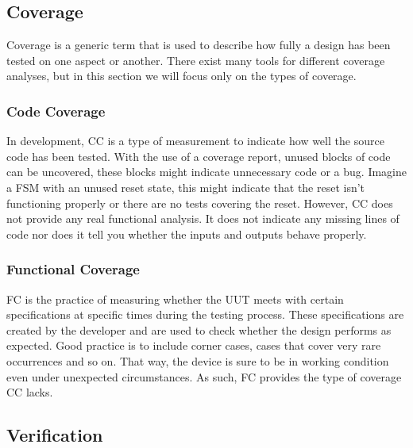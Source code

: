 \documentclass[11pt,british]{article}
\begin{document}
\subsection{Coverage}
Coverage is a generic term that is used to describe how fully a design has been tested on one aspect or another. There exist many tools for different coverage analyses, but in this section we will focus only on the types of coverage.

\subsubsection{Code Coverage}
In development, \gls{CC} is a type of measurement to indicate how well the source code has been tested. With the use of a coverage report, unused blocks of code can be uncovered, these blocks might indicate unnecessary code or a bug. Imagine a \gls{FSM} with an unused reset state, this might indicate that the reset isn't functioning properly or there are no tests covering the reset. However, CC does not provide any real functional analysis. It does not indicate any missing lines of code nor does it tell you whether the inputs and outputs behave properly.\cite{coverage1,coverage2}

\subsubsection{Functional Coverage}
\gls{FC} is the practice of measuring whether the \gls{UUT} meets with certain specifications at specific times during the testing process. These specifications are created by the developer and are used to check whether the design performs as expected. Good practice is to include corner cases, cases that cover very rare occurrences and so on. That way, the device is sure to be in working condition even under unexpected circumstances. As such, FC provides the type of coverage CC lacks.\cite{functional1,functional2}

\subsection{Verification}
\end{document}
